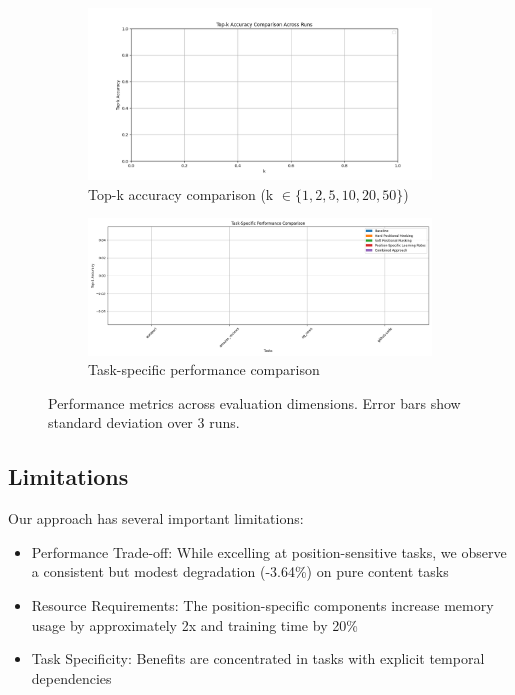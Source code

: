 \documentclass{article} %
\begin{document}
\begin{figure}[h]
    \centering
    \begin{subfigure}[b]{0.49\textwidth}
        \includegraphics[width=\textwidth]{top_k_accuracy.png}
        \caption{Top-k accuracy comparison (k $\in \{1,2,5,10,20,50\}$)}
        \label{fig:topk_acc}
    \end{subfigure}
    \hfill
    \begin{subfigure}[b]{0.49\textwidth}
        \includegraphics[width=\textwidth]{task_specific_accuracy.png}
        \caption{Task-specific performance comparison}
        \label{fig:task_acc}
    \end{subfigure}
    \caption{Performance metrics across evaluation dimensions. Error bars show standard deviation over 3 runs.}
    \label{fig:main_results}
\end{figure}

\subsection{Limitations}
Our approach has several important limitations:

\begin{itemize}
    \item Performance Trade-off: While excelling at position-sensitive tasks, we observe a consistent but modest degradation (-3.64\%) on pure content tasks
    \item Resource Requirements: The position-specific components increase memory usage by approximately 2x and training time by 20\%
    \item Task Specificity: Benefits are concentrated in tasks with explicit temporal dependencies
\end{itemize}
\end{document}
